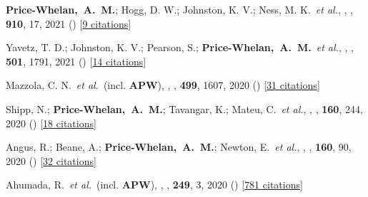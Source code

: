 \item[{\color{deemph}\scriptsize71}]\textbf{Price-Whelan,~A.~M.}; Hogg, D. W.; Johnston, K. V.; Ness, M. K.~\textit{et al.}, , \apj, \textbf{910}, 17, 2021 () [\href{http://adsabs.harvard.edu/abs/2021ApJ...910...17P}{9 citations}]

\item[{\color{deemph}\scriptsize70}]Yavetz, T. D.; Johnston, K. V.; Pearson, S.; \textbf{Price-Whelan,~A.~M.}~\textit{et al.}, , \mnras, \textbf{501}, 1791, 2021 () [\href{http://adsabs.harvard.edu/abs/2021MNRAS.501.1791Y}{14 citations}]

\item[{\color{deemph}\scriptsize69}]Mazzola, C. N.~\textit{et al.}~(incl. \textbf{APW}), , \mnras, \textbf{499}, 1607, 2020 () [\href{http://adsabs.harvard.edu/abs/2020MNRAS.499.1607M}{31 citations}]

\item[{\color{deemph}\scriptsize68}]Shipp, N.; \textbf{Price-Whelan,~A.~M.}; Tavangar, K.; Mateu, C.~\textit{et al.}, , \aj, \textbf{160}, 244, 2020 () [\href{http://adsabs.harvard.edu/abs/2020AJ....160..244S}{18 citations}]

\item[{\color{deemph}\scriptsize67}]Angus, R.; Beane, A.; \textbf{Price-Whelan,~A.~M.}; Newton, E.~\textit{et al.}, , \aj, \textbf{160}, 90, 2020 () [\href{http://adsabs.harvard.edu/abs/2020AJ....160...90A}{32 citations}]

\item[{\color{deemph}\scriptsize66}]Ahumada, R.~\textit{et al.}~(incl. \textbf{APW}), , \apjs, \textbf{249}, 3, 2020 () [\href{http://adsabs.harvard.edu/abs/2020ApJS..249....3A}{781 citations}]

